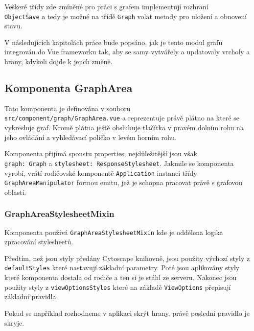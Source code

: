\bigskip

Veškeré třídy zde zmíněné pro práci s grafem implementují rozhraní \\\texttt{ObjectSave} a tedy je možné na třídě \texttt{Graph} volat metody pro uložení a obnovení stavu.







\newpage

V následujících kapitolách práce bude popsáno, jak je tento modul grafu integrován do Vue frameworku tak, aby se samy vytvářely a updatovaly vrcholy a hrany, kdykoli dojde k jejich změně.

\subsection{Komponenta GraphArea} \label{komponenta-graph-area}
Tato komponenta je definována v souboru \\\texttt{src/component/graph/GraphArea.vue} a reprezentuje právě plátno na které se vykresluje graf. Kromě plátna ještě obsluhuje tlačítka v pravém dolním rohu na jeho ovládání a vyhledávací políčko v levém horním rohu.

Komponenta přijímá spoustu properties, nejdůležitější jsou však \\\texttt{graph: Graph} a \texttt{stylesheet: ResponseStylesheet}. Jakmile se komponenta vyrobí, vrátí rodičovské komponentě \texttt{Application} instanci třídy \\\texttt{GraphAreaManipulator} formou emitu, jež je schopna pracovat právě s grafovou oblastí.

\subsubsection{GraphAreaStylesheetMixin}

Komponenta používá \texttt{GraphAreaStylesheetMixin} kde je oddělena logika \\zpracování stylesheetů.

Předtím, než jsou styly předány Cytoscape knihovně, jsou použity výchozí styly z \texttt{defaultStyles} které nastavují základní parametry. Poté jsou aplikovány styly které komponenta dostala od rodiče a ten si je stáhl ze serveru. Nakonec jsou použity styly z \texttt{viewOptionsStyles} které na základě \texttt{ViewOptions} přepisují základní pravidla.

Pokud se například rozhodneme v aplikaci skrýt hrany, právě poslední pravidlo je skryje.

